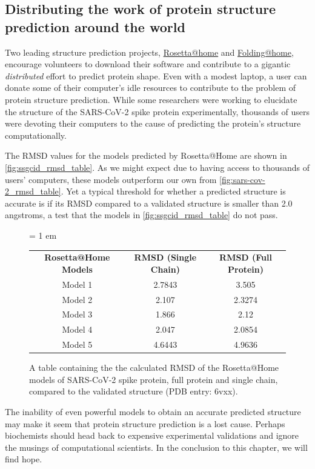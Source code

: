 \subsection{Distributing the work of protein structure prediction around the world}

Two leading structure prediction projects, \href{https://boinc.bakerlab.org}{Rosetta@home} and \href{https://foldingathome.org}{Folding@home}, encourage volunteers to download their software and contribute to a gigantic \textit{distributed} effort to predict protein shape. Even with a modest laptop, a user can donate some of their computer's idle resources to contribute to the problem of protein structure prediction. While some researchers were working to elucidate the structure of the SARS-CoV-2 spike protein experimentally, thousands of users were devoting their computers to the cause of predicting the protein's structure computationally.

The RMSD values for the models predicted by Rosetta@Home are shown in \autoref{fig:ssgcid_rmsd_table}. As we might expect due to having access to thousands of users' computers, these models outperform our own from \autoref{fig:sars-cov-2_rmsd_table}. Yet a typical threshold for whether a predicted structure is accurate is if its RMSD compared to a validated structure is smaller than 2.0 angstroms, a test that the models in \autoref{fig:ssgcid_rmsd_table} do not pass.

\begin{figure}[h]
	\centering
	\tabcolsep = 1 em
	\mySfFamily
	\begin{tabular}{c c c}
		\textbf{Rosetta@Home Models} & \textbf{RMSD (Single Chain)} & \textbf{RMSD (Full Protein)}\\
		Model 1  & 2.7843 & 3.505\phantom{x}  \\
		Model 2  & 2.107\phantom{x} & 2.3274 \\
		Model 3  & 1.866\phantom{x} & 2.12\phantom{xx} \\
		Model 4  & 2.047\phantom{x} & 2.0854 \\
		Model 5  & 4.6443 & 4.9636
	\end{tabular}
	\caption{A table containing the the calculated RMSD of the Rosetta@Home models of SARS-CoV-2 spike protein, full protein and single chain, compared to the validated structure (PDB entry: 6vxx).}
	\label{fig:ssgcid_rmsd_table}
\end{figure}

The inability of even powerful models to obtain an accurate predicted structure may make it seem that protein structure prediction is a lost cause. Perhaps biochemists should head back to expensive experimental validations and ignore the musings of computational scientists. In the conclusion to this chapter, we will find hope.\\

